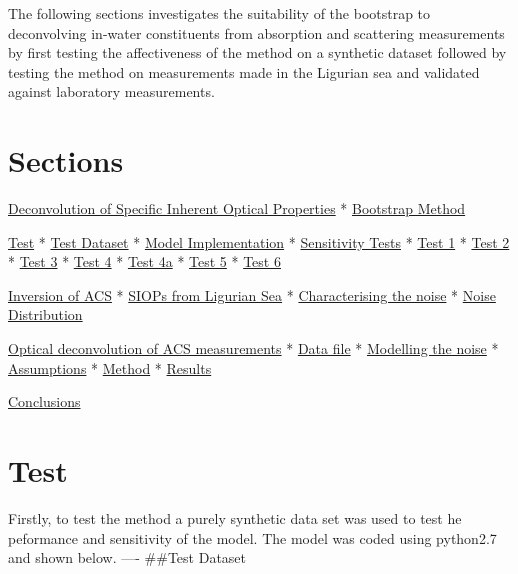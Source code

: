 \documentclass{article}
\begin{document}
The following sections investigates the suitability of the bootstrap to
deconvolving in-water constituents from absorption and scattering
measurements by first testing the affectiveness of the method on a
synthetic dataset followed by testing the method on measurements made in
the Ligurian sea and validated against laboratory measurements.

    \section{Sections}\label{sections}

\hyperref[section1]{Deconvolution of Specific Inherent Optical
Properties} * \hyperref[section1.1]{Bootstrap Method}

\hyperref[section2]{Test} * \hyperref[section2.1]{Test Dataset} *
\hyperref[section2.3]{Model Implementation} *
\hyperref[section3]{Sensitivity Tests} * \hyperref[section3.1]{Test 1} *
\hyperref[section3.2]{Test 2} * \hyperref[section3.3]{Test 3} *
\hyperref[section3.4]{Test 4} * \hyperref[section3.4.1]{Test 4a} *
\hyperref[section3.5]{Test 5} * \hyperref[section3.5]{Test 6}

\hyperref[section4]{Inversion of ACS} * \hyperref[section4.1]{SIOPs from
Ligurian Sea} * \hyperref[section4.2]{Characterising the noise} *
\hyperref[section4.3]{Noise Distribution}

\hyperref[section5]{Optical deconvolution of ACS measurements} *
\hyperref[section5.1]{Data file} * \hyperref[section5.2]{Modelling the
noise} * \hyperref[section5.2.1]{Assumptions} *
\hyperref[section5.2.2]{Method} * \hyperref[section5.3]{Results}

\hyperref[section6]{Conclusions}

    \subsection{}\label{section}

\section{Test}\label{test}

Firstly, to test the method a purely synthetic data set was used to test
he peformance and sensitivity of the model. The model was coded using
python2.7 and shown below. ---- \#\#Test Dataset
\end{document}
